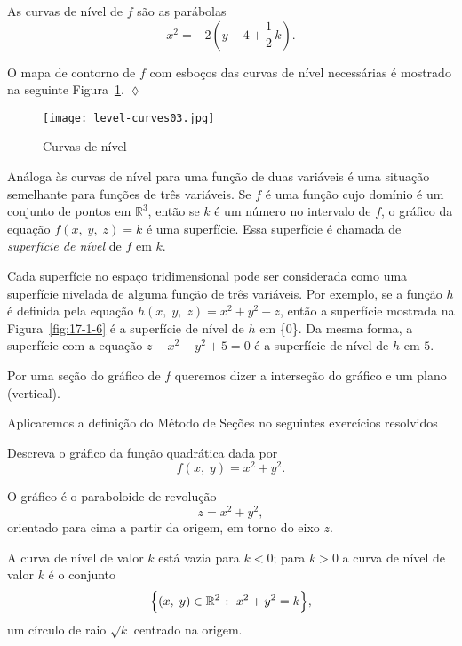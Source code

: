 As curvas de nível de \(f\) são as parábolas 
\begin{equation*}
	x^{2}=-2\left(y-4+\frac{1}{2}\,k\right).
\end{equation*} 

O mapa de contorno de \(f\) com esboços das curvas de nível necessárias é mostrado  na seguinte  Figura~\ref{fig:17-1-9}. \hfill \(\lozenge\)
%
\begin{figure}[H]
	\centering
	\texttt{[image: level-curves03.jpg]}
	\caption{Curvas de nível}
	\label{fig:17-1-9}
\end{figure}
%

Análoga às curvas de nível para uma função de duas variáveis é uma situação semelhante para funções de três variáveis. Se \(f\) é uma função cujo domínio 
é um conjunto de pontos em \(\mathbb{R}^{3}\), então se \(k\) é um número no intervalo de \(f\), o gráfico da equação \(f(x,\; y,\; z) = k\) é uma 
superfície. Essa superfície é chamada de \textit{superfície de nível} de \(f\) em \(k\).

Cada superfície no espaço tridimensional pode ser considerada como uma superfície nivelada de alguma função de três variáveis. Por exemplo, se a função 
\(h\) é definida pela equação \(h(x,\; y,\; z)=x^{2}+y^{2}-z\), então a superfície mostrada na Figura~\ref{fig:17-1-6} é a superfície de nível de \(h\) em 
\{0\}. Da mesma forma, a superfície com a equação \(z-x^{2}-y^{2}+5=0\) é a superfície de nível de \(h\) em \(5\).

\begin{defi}
	Por uma seção do gráfico de \(f\) queremos dizer a interseção do gráfico e um plano (vertical).
\end{defi}

Aplicaremos a definição do Método de Seções no seguintes exercícios resolvidos
\begin{exer}\label{exe:2-1-3}
	Descreva o gráfico da função quadrática dada por
	\begin{equation*}
		f(x,\; y) = x^{2}+y^{2}.
	\end{equation*} 	
\end{exer}

\solo
O gráfico é o paraboloide de revolução
\begin{equation*}
	z = x^{2}+y^{2},
\end{equation*}
orientado para cima a partir da origem, em torno do eixo \(z\).

A curva de nível de valor \(k\) está vazia para \(k < 0\); para \(k > 0\) a curva de nível de valor \(k\) é o conjunto
\begin{equation*}
	\Bigl\{(x,\; y) \in \mathbb{R}^{2}\; \colon\;  x^{2}+y^{2}= k  \Bigr\},
\end{equation*}
um círculo de raio \(\sqrt{k}\) centrado na origem.

